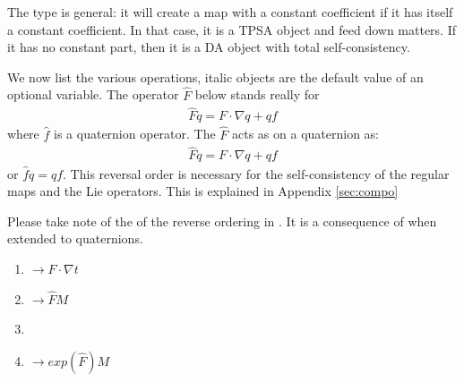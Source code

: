 \documentclass[english,12pt,article]{article} %
\begin{document}
{{{The type   is general: it will create a map with a constant coefficient if it has itself a constant coefficient. In that case, it is a TPSA object and feed down matters. If it has no constant part, then it is a DA object with total self-consistency. 

We now list the various operations, italic objects are the default value of an  optional variable. The operator $\widehat{F}$ below stands really for %
%
\begin{align} \widehat{F}q=
F\cdot \nabla q+qf \label{hop?}\end{align}
%
where $\hat{f}$ is a quaternion operator.  The $\widehat{F}$  acts as on a quaternion as:
%
\begin{align} \widehat{F}q=
F\cdot \nabla q+qf \label{hop}\end{align}
%
or $\hat{f}q=qf$.  This reversal order is necessary for the self-consistency of the regular maps and the Lie operators. This is explained in Appendix \ref{sec:compo}



Please take note of the of the reverse ordering in . It is a consequence of  when extended to quaternions.

\begin{enumerate}

\item  {}        %
%
$\rightarrow F\cdot \nabla t$

\item  {}         
%
$\rightarrow \widehat{F}M$

\item {}

\item {}
%
$\rightarrow exp\left({\widehat{F}}\right)M$


\end{enumerate}}}}
\end{document}
